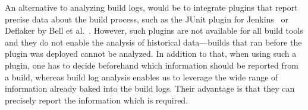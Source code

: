 


An alternative to analyzing build logs, would be to integrate plugins
that report precise data about the build process, such as the JUnit
plugin for Jenkins~\cite{jenkins2020junit-plugin} or
Deflaker by Bell et al.~\cite{bell2018deflaker}.
However, such plugins are not available for all build tools and they
do not enable the analysis of historical data---builds that ran before
the plugin was deployed cannot be analyzed.
In addition to that, when using such a plugin, one has to decide
beforehand which information should be reported from a build, whereas
build log analysis enables us to leverage the wide range of information
already baked into the build logs.
Their advantage is that they can precisely report the information which
is required.




